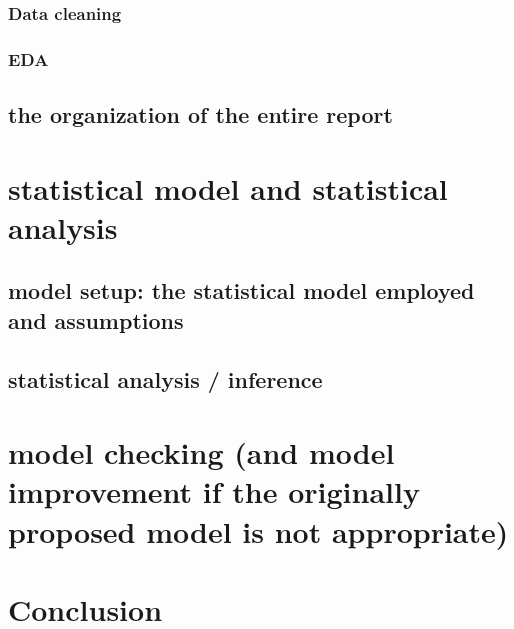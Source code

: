 \documentclass[12pt,notitlepage]{article}
\begin{document}
\subsubsection{Data cleaning}


\subsubsection{EDA}


\subsection{the organization of the entire report}




\section{statistical model and statistical analysis}


\subsection{model setup: the statistical model employed and assumptions}


\subsection{statistical analysis / inference}






\section{model checking (and model improvement if the originally proposed model is not appropriate)}






\section{Conclusion}






\pagebreak

%
%
\end{document}
